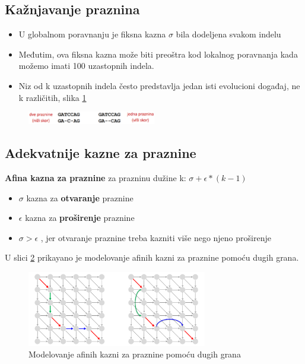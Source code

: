 \subsection{Kažnjavanje praznina}

\begin{itemize}
    \item U globalnom poravnanju je fiksna kazna $\sigma$ bila dodeljena svakom indelu
    \item Međutim, ova fiksna kazna može biti preoštra
kod lokalnog poravnanja kada možemo imati 100 uzastopnih indela.
    \item Niz od k uzastopnih indela često predstavlja jedan isti evolucioni događaj, ne k različitih, slika \ref{slika:kaznjavanje}
\end{itemize}

\begin{figure}[h]
\centering
\includegraphics[width=0.5\textwidth]{poglavlja/5/slike/kaznjavanjePraznina.png}
\caption{}
\label{slika:kaznjavanje}
\end{figure}

\subsection{Adekvatnije kazne za praznine}

\textbf{Afina kazna za praznine} za prazninu dužine k:  \textbf{$\sigma+\epsilon*(k-1)$}
\begin{itemize}
    \item $\sigma$ kazna za \textbf{otvaranje} praznine
    \item $\epsilon$ kazna za \textbf{proširenje} praznine
    \item $ \sigma > \epsilon$ , jer otvaranje praznine treba kazniti više nego njeno proširenje
\end{itemize}



U slici \ref{slika:modelovanje} prikayano je modelovanje afinih kazni za praznine pomoću dugih grana.

\begin{figure}[h!]
\centering
\includegraphics[width=0.7\textwidth]{poglavlja/5/slike/modelovanjePomocuDugihGrana.png}
\caption{Modelovanje afinih kazni za praznine pomoću dugih grana}
\label{slika:modelovanje}
\end{figure}

